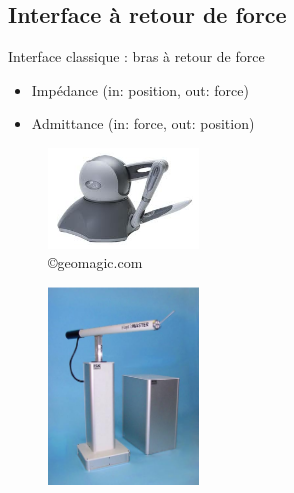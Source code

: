 \documentclass[compress, noflama]{beamer}
\begin{document}
\subsection{Interface à retour de force}
\begin{frame}{Interface classique : bras à retour de force}
\begin{itemize}
\item Impédance (in: position, out: force)
\item Admittance (in: force, out: position)
\end{itemize}

\begin{multicols}{2}
\begin{figure}
\centering
\includegraphics[width=4cm]{images/phantom}
\caption{\copyright geomagic.com}
\end{figure}
%
\begin{figure}
\centering
\includegraphics[width=4cm]{images/hapticMaster}
\caption{\cite{VanderLinde2002}}
\end{figure}
\end{multicols}
\end{frame}
\end{document}
